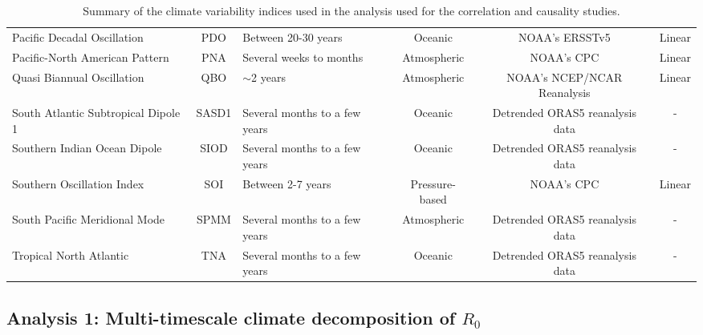 \documentclass[fleqn,10pt]{wlscirep}
\begin{document}
\begin{table*}[t]
{\begin{tabular}{l|c|l|c|c|c}
  Pacific Decadal Oscillation         & PDO                                        & Between 20-30 years           & Oceanic                                    & NOAA's ERSSTv5                         & Linear                     \\
  Pacific-North American Pattern      & PNA                                        & Several weeks to months       & Atmospheric                                & NOAA's CPC                             & Linear                     \\
  Quasi Biannual Oscillation          & QBO                                        & $\sim$2 years                 & Atmospheric                                & NOAA's NCEP/NCAR Reanalysis            & Linear                     \\
  South Atlantic Subtropical Dipole 1 & SASD1                                      & Several months to a few years & Oceanic                                    & Detrended ORAS5 reanalysis data        & -                          \\
  Southern Indian Ocean Dipole        & SIOD                                       & Several months to a few years & Oceanic                                    & Detrended ORAS5 reanalysis data        & -                          \\
  Southern Oscillation Index          & SOI                                        & Between 2-7 years             & Pressure-based                             & NOAA's CPC                             & Linear                     \\
  South Pacific Meridional Mode       & SPMM                                       & Several months to a few years & Atmospheric                                & Detrended ORAS5 reanalysis data        & -                          \\
  Tropical North Atlantic             & TNA                                        & Several months to a few years & Oceanic                                    & Detrended ORAS5 reanalysis data        & -                         
  \end{tabular}%
  }
  \caption{Summary of the climate variability indices used in the analysis used for the correlation and causality studies.}
  \label{tab:climate-variability-indices}
  \end{table*}
    
  \subsection{Analysis 1: Multi-timescale climate decomposition of $R_0$} \label{sec-methods-1-analysis}
\end{document}
